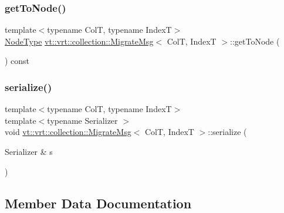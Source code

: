 \subsubsection{\texorpdfstring{get\+To\+Node()}{getToNode()}}
{\footnotesize\ttfamily template$<$typename ColT, typename IndexT$>$ \\
\hyperlink{namespacevt_a866da9d0efc19c0a1ce79e9e492f47e2}{Node\+Type} \hyperlink{structvt_1_1vrt_1_1collection_1_1_migrate_msg}{vt\+::vrt\+::collection\+::\+Migrate\+Msg}$<$ ColT, IndexT $>$\+::get\+To\+Node (\begin{DoxyParamCaption}{ }\end{DoxyParamCaption}) const\hspace{0.3cm}{\ttfamily [inline]}}

\mbox{\label{structvt_1_1vrt_1_1collection_1_1_migrate_msg_afd275449bca23638c2d8139fff35d39f}} 
\subsubsection{\texorpdfstring{serialize()}{serialize()}}
{\footnotesize\ttfamily template$<$typename ColT, typename IndexT$>$ \\
template$<$typename Serializer $>$ \\
void \hyperlink{structvt_1_1vrt_1_1collection_1_1_migrate_msg}{vt\+::vrt\+::collection\+::\+Migrate\+Msg}$<$ ColT, IndexT $>$\+::serialize (\begin{DoxyParamCaption}\item[{Serializer \&}]{s }\end{DoxyParamCaption})\hspace{0.3cm}{\ttfamily [inline]}}



\subsection{Member Data Documentation}
\mbox{\label{structvt_1_1vrt_1_1collection_1_1_migrate_msg_aa074fd362c469f1a0aae30d1cf9888bf}} 
